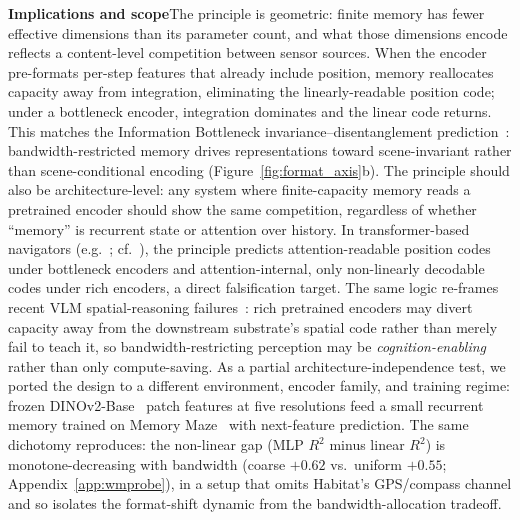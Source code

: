 \documentclass{article}
\begin{document}
\noindent\textbf{Implications and scope}\quad The principle is geometric: finite memory has fewer effective dimensions than its parameter count, and what those dimensions encode reflects a content-level competition between sensor sources. When the encoder pre-formats per-step features that already include position, memory reallocates capacity away from integration, eliminating the linearly-readable position code; under a bottleneck encoder, integration dominates and the linear code returns. This matches the Information Bottleneck invariance--disentanglement prediction~\citep{tishby2000ib,achille2018invariance}: bandwidth-restricted memory drives representations toward scene-invariant rather than scene-conditional encoding (Figure~\ref{fig:format_axis}b). The principle should also be architecture-level: any system where finite-capacity memory reads a pretrained encoder should show the same competition, regardless of whether ``memory'' is recurrent state or attention over history. In transformer-based navigators (e.g.\ \citealt{zeng2024poliformer}; cf.\ \citealt{whittington2022transformerhippocampus}), the principle predicts attention-readable position codes under bottleneck encoders and attention-internal, only non-linearly decodable codes under rich encoders, a direct falsification target. The same logic re-frames recent VLM spatial-reasoning failures~\citep{ramakrishnan2025space}: rich pretrained encoders may divert capacity away from the downstream substrate's spatial code rather than merely fail to teach it, so bandwidth-restricting perception may be \emph{cognition-enabling} rather than only compute-saving. As a partial architecture-independence test, we ported the design to a different environment, encoder family, and training regime: frozen DINOv2-Base~\citep{oquab2024dinov2} patch features at five resolutions feed a small recurrent memory trained on Memory Maze~\citep{pasukonis2023memorymaze} with next-feature prediction. The same dichotomy reproduces: the non-linear gap (MLP $R^2$ minus linear $R^2$) is monotone-decreasing with bandwidth (coarse $+0.62$ vs.\ uniform $+0.55$; Appendix~\ref{app:wmprobe}), in a setup that omits Habitat's GPS/compass channel and so isolates the format-shift dynamic from the bandwidth-allocation tradeoff.
\end{document}
